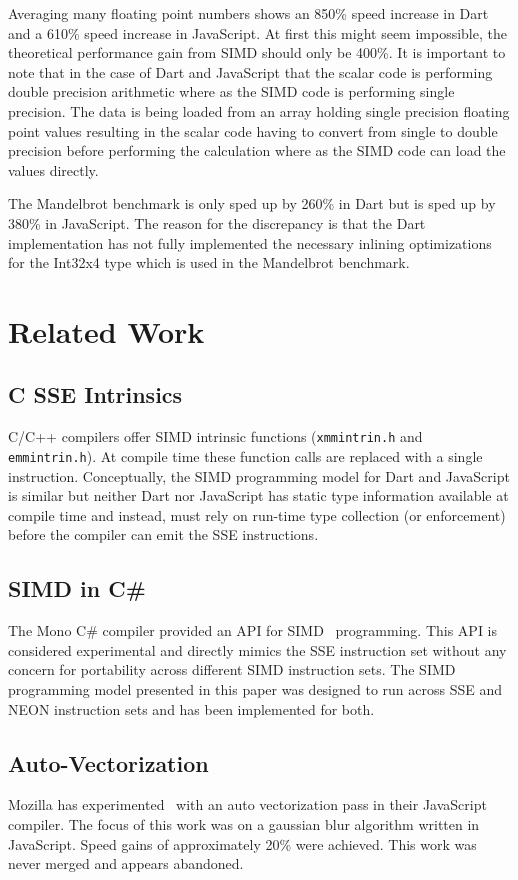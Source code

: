 \documentclass[preprint]{sigplanconf}
\begin{document}
Averaging many floating point numbers shows an 850\% speed increase in Dart and a 610\% speed increase in JavaScript. At first this might seem impossible, the theoretical performance gain from SIMD should only be 400\%. It is important to note that in the case of Dart and JavaScript that the scalar code is performing double precision arithmetic where as the SIMD code is performing single precision. The data is being loaded from an array holding single precision floating point values resulting in the scalar code having to convert from single to double precision before performing the calculation where as the SIMD code can load the values directly.

The Mandelbrot benchmark is only sped up by 260\% in Dart but is sped up by 380\% in JavaScript. The reason for the discrepancy is that the Dart implementation has not fully implemented the necessary inlining optimizations for the Int32x4 type which is used in the Mandelbrot benchmark. 

\section{Related Work}
\subsection{C SSE Intrinsics}
C/C++ compilers offer SIMD intrinsic functions (\verb!xmmintrin.h! and \verb!emmintrin.h!). At compile time these function calls are replaced with a single instruction. Conceptually, the SIMD programming model for Dart and JavaScript is similar but neither Dart nor JavaScript has static type information available at compile time and instead, must rely on run-time type collection (or enforcement) before the compiler can emit the SSE instructions.
\subsection{SIMD in C\#}
The Mono C\# compiler provided an API for SIMD~\cite{monosimd} programming. This API is considered experimental and directly mimics the SSE instruction set without any concern for portability across different SIMD instruction sets. The SIMD programming model presented in this paper was designed to run across SSE and NEON instruction sets and has been implemented for both.
\subsection{Auto-Vectorization}
Mozilla has experimented~\cite{mozillasimd} with an auto vectorization pass in their JavaScript compiler. The focus of this work was on a gaussian blur algorithm written in JavaScript. Speed gains of approximately 20\% were achieved. This work was never merged and appears abandoned.
\end{document}
